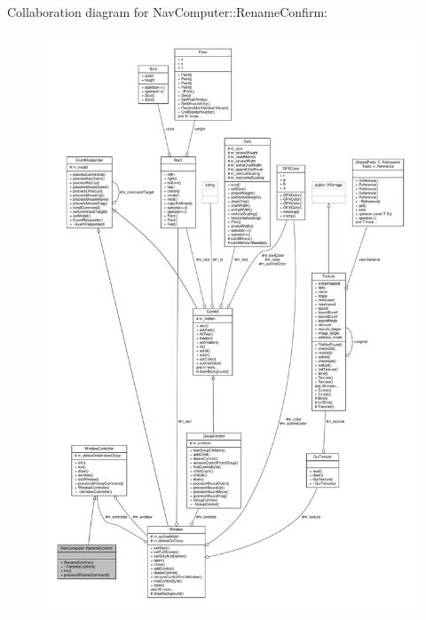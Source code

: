 Collaboration diagram for Nav\+Computer\+:\+:Rename\+Confirm\+:
\nopagebreak
\begin{figure}[H]
\begin{center}
\leavevmode
\includegraphics[width=350pt]{dd/d9c/classNavComputer_1_1RenameConfirm__coll__graph}
\end{center}
\end{figure}
